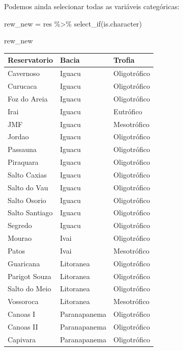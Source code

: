 \documentclass[
]{book}
\newenvironment{Shaded}{\begin{snugshade}}{\end{snugshade}}
\newcommand{\FunctionTok}[1]{\textcolor[rgb]{0.00,0.00,0.00}{#1}}
\newcommand{\NormalTok}[1]{#1}
\newcommand{\OtherTok}[1]{\textcolor[rgb]{0.56,0.35,0.01}{#1}}
\newcommand{\SpecialCharTok}[1]{\textcolor[rgb]{0.00,0.00,0.00}{#1}}
\begin{document}
Podemos ainda selecionar todas as variáveis categóricas:

\begin{Shaded}
\begin{Highlighting}[]
\NormalTok{rew\_new }\OtherTok{=}\NormalTok{ res }\SpecialCharTok{\%\textgreater{}\%} 
  \FunctionTok{select\_if}\NormalTok{(is.character)}

\NormalTok{rew\_new}
\end{Highlighting}
\end{Shaded}

\begin{table}
\centering\begingroup\fontsize{12}{14}\selectfont

\begin{tabular}{lll}
\toprule
Reservatorio & Bacia & Trofia\\
\midrule
Cavernoso & Iguacu & Oligotrófico\\
Curucaca & Iguacu & Oligotrófico\\
Foz do Areia & Iguacu & Oligotrófico\\
Irai & Iguacu & Eutrófico\\
JMF & Iguacu & Mesotrófico\\
\addlinespace
Jordao & Iguacu & Oligotrófico\\
Passauna & Iguacu & Oligotrófico\\
Piraquara & Iguacu & Oligotrófico\\
Salto Caxias & Iguacu & Oligotrófico\\
Salto do Vau & Iguacu & Oligotrófico\\
\addlinespace
Salto Osorio & Iguacu & Oligotrófico\\
Salto Santiago & Iguacu & Oligotrófico\\
Segredo & Iguacu & Oligotrófico\\
Mourao & Ivai & Oligotrófico\\
Patos & Ivai & Mesotrófico\\
\addlinespace
Guaricana & Litoranea & Oligotrófico\\
Parigot Souza & Litoranea & Oligotrófico\\
Salto do Meio & Litoranea & Oligotrófico\\
Vossoroca & Litoranea & Mesotrófico\\
Canoas I & Paranapanema & Oligotrófico\\
\addlinespace
Canoas II & Paranapanema & Oligotrófico\\
Capivara & Paranapanema & Oligotrófico\\

\end{tabular}
\end{table}
\end{document}
